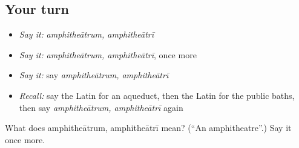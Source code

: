 \subsection*{Your turn}
\begin{itemize}
\raggedright
  \item \emph{Say it:} \emph{amphitheātrum, amphitheātrī}
  \item \emph{Say it:} \emph{amphitheātrum, amphitheātrī}, once more
  \item \emph{Say it:} say \emph{amphitheātrum, amphitheātrī}
  \item \emph{Recall:} say the Latin for an aqueduct, then the Latin for the public baths, then say \emph{amphitheātrum, amphitheātrī} again
\end{itemize}

\begin{tcolorbox}[breakable,colback=teal!4,colframe=teal!35!black,title={Before you move on}]
What does amphitheātrum, amphitheātrī mean? (\textquotedblleft{}An amphitheatre\textquotedblright{}.) Say it once more.
\end{tcolorbox}
